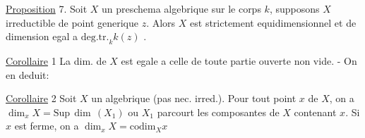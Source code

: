 \uline{Proposition} 7. Soit $X$ un preschema algebrique sur le corps $k$, supposons
$X$ irreductible de point generique $z$. Alors $X$ est strictement equidimensionnel
et de dimension egal a $\mathrm{deg.tr.}_k k(z)$ .

\uline{Corollaire} 1 \quad La dim. de $X$ est egale a celle de toute partie ouverte
non vide. \qquad - \quad On en deduit:

\uline{Corollaire} 2 \quad Soit $X$ un  algebrique (pas nec. irred.). Pour
tout point  $x$ de $X$, on a $\dim_x X=\mathrm{Sup}\,\dim\,(X_1)$ ou $X_1$ parcourt les
composantes de $X$ contenant $x$. Si $x$ est ferme, on a $\dim_x X=\mathrm{codim}_X x$
